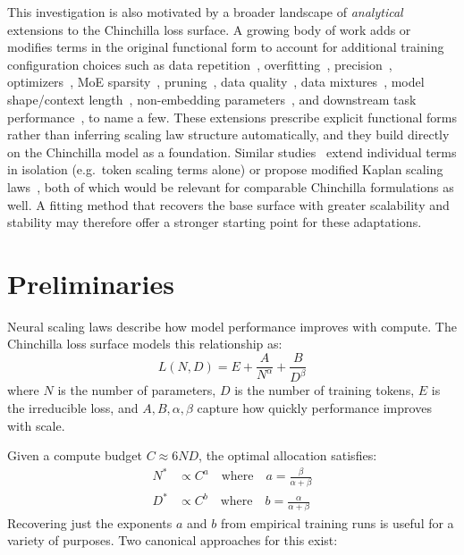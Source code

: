 \documentclass[11pt]{article}
\begin{document}
This investigation is also motivated by a broader landscape of
\emph{analytical} extensions to the Chinchilla loss surface. A growing body of
work adds or modifies terms in the original functional form to account for
additional training configuration choices such as data
repetition~\citep{data_constrained},
overfitting~\citep{mupt}, precision~\citep{precision_scaling},
optimizers~\citep{optimizer_scaling}, MoE
sparsity~\citep{moe_memory_scaling},
pruning~\citep{pruning_scaling}, data quality~\citep{quality_scaling}, data
mixtures~\citep{optimal_data_mixtures,atlas_multilingual},
model shape/context length~\citep{icr_scaling},
non-embedding parameters~\citep{reconciling_scaling}, and downstream task
performance~\citep{ai2_task_scaling}, to name a few. These extensions prescribe
explicit functional forms rather than inferring scaling law structure
automatically, and they build directly on the Chinchilla model as a foundation.
Similar
studies~\citep{data_filtering_scaling,moe_scaling,subgroup_scaling}
extend individual terms in isolation (e.g.\ token scaling terms alone) or
propose modified Kaplan scaling laws~\citep{kaplan_scaling}, both of which
would be relevant for comparable Chinchilla formulations as well. A fitting
method that recovers the base surface with greater scalability and stability may
therefore offer a stronger starting point for these adaptations.

\section{Preliminaries}
\label{sec:preliminaries}

Neural scaling laws describe how model performance improves with compute. The
Chinchilla loss surface models this relationship as:
\begin{equation}
    L(N, D) = E + \frac{A}{N^\alpha} + \frac{B}{D^\beta}
    \label{eq:loss_surface}
\end{equation}
where $N$ is the number of parameters, $D$ is the number of training tokens,
$E$ is the irreducible loss, and $A, B, \alpha, \beta$ capture how quickly
performance improves with scale.

Given a compute budget $C \approx 6ND$, the optimal allocation satisfies:
\begin{align}
    N^* &\propto C^a \quad \text{where} \quad a = \frac{\beta}{\alpha + \beta}
    \label{eq:optimal_n} \\
    D^* &\propto C^b \quad \text{where} \quad b = \frac{\alpha}{\alpha + \beta}
    \label{eq:optimal_d}
\end{align}
Recovering just the exponents $a$ and $b$ from empirical training runs is
useful for a variety of purposes. Two canonical approaches for this exist:
\end{document}
